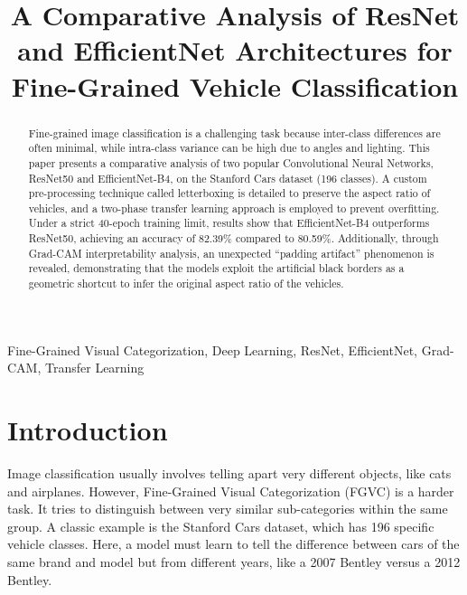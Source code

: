 \documentclass[conference]{IEEEtran}
\begin{document}
\title{A Comparative Analysis of ResNet and EfficientNet Architectures for Fine-Grained Vehicle Classification}

\author{
}

\maketitle

\begin{abstract}
Fine-grained image classification is a challenging task because inter-class differences are often minimal, while intra-class variance can be high due to angles and lighting. This paper presents a comparative analysis of two popular Convolutional Neural Networks, ResNet50 and EfficientNet-B4, on the Stanford Cars dataset (196 classes). A custom pre-processing technique called letterboxing is detailed to preserve the aspect ratio of vehicles, and a two-phase transfer learning approach is employed to prevent overfitting. Under a strict 40-epoch training limit, results show that EfficientNet-B4 outperforms ResNet50, achieving an accuracy of 82.39\% compared to 80.59\%. Additionally, through Grad-CAM interpretability analysis, an unexpected ``padding artifact'' phenomenon is revealed, demonstrating that the models exploit the artificial black borders as a geometric shortcut to infer the original aspect ratio of the vehicles.
\end{abstract}

\begin{IEEEkeywords}
Fine-Grained Visual Categorization, Deep Learning, ResNet, EfficientNet, Grad-CAM, Transfer Learning
\end{IEEEkeywords}

\section{Introduction}
Image classification usually involves telling apart very different objects, like cats and airplanes. However, Fine-Grained Visual Categorization (FGVC) is a harder task. It tries to distinguish between very similar sub-categories within the same group. A classic example is the Stanford Cars dataset, which has 196 specific vehicle classes. Here, a model must learn to tell the difference between cars of the same brand and model but from different years, like a 2007 Bentley versus a 2012 Bentley.
\end{document}
